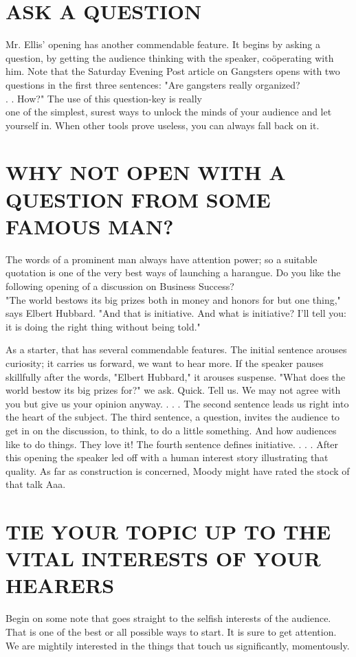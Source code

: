 \documentclass[10pt]{article}
\begin{document}
\section*{ASK A QUESTION}
Mr. Ellis' opening has another commendable feature. It begins by asking a question, by getting the audience thinking with the speaker, coöperating with him. Note that the Saturday Evening Post article on Gangsters opens with two questions in the first three sentences: "Are gangsters really organized?\\
. . How?" The use of this question-key is really\\
one of the simplest, surest ways to unlock the minds of your audience and let yourself in. When other tools prove useless, you can always fall back on it.

\section*{WHY NOT OPEN WITH A QUESTION FROM SOME FAMOUS MAN?}
The words of a prominent man always have attention power; so a suitable quotation is one of the very best ways of launching a harangue. Do you like the following opening of a discussion on Business Success?\\
"The world bestows its big prizes both in money and honors for but one thing," says Elbert Hubbard. "And that is initiative. And what is initiative? I'll tell you: it is doing the right thing without being told."

As a starter, that has several commendable features. The initial sentence arouses curiosity; it carries us forward, we want to hear more. If the speaker pauses skillfully after the words, "Elbert Hubbard," it arouses suspense. "What does the world bestow its big prizes for?" we ask. Quick. Tell us. We may not agree with you but give us your opinion anyway. . . . The second sentence leads us right into the heart of the subject. The third sentence, a question, invites the audience to get in on the discussion, to think, to do a little something. And how audiences like to do things. They love it! The fourth sentence defines initiative. . . . After this opening the speaker led off with a human interest story illustrating that quality. As far as construction is concerned, Moody might have rated the stock of that talk Aaa.

\section*{TIE YOUR TOPIC UP TO THE VITAL INTERESTS OF YOUR HEARERS}
Begin on some note that goes straight to the selfish interests of the audience. That is one of the best or all possible ways to start. It is sure to get attention. We are mightily interested in the things that touch us significantly, momentously.
\end{document}
